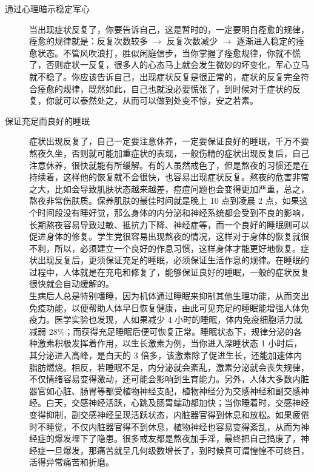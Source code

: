 \documentclass{ctexart}
\begin{document}
\begin{description}
    \item[通过心理暗示稳定军心] 当出现症状反复了，你要告诉自己，这是暂时的，一定要明白痊愈的规律，痊愈的规律就是：反复次数较多 $\to$ 反复次数减少 $\to$ 逐渐进入稳定的痊愈状态。不管风吹浪打，胜似闲庭信步，当你掌握了痊愈规律，你就不慌了，否则症状一反复，很多人的心态马上就会发生微妙的坏变化，军心立马就不稳了。你应该告诉自己，出现症状反复是很正常的，症状的反复完全符合痊愈的规律，既然如此，自己也就没必要慌张了，到时候对于症状的反复，你就可以泰然处之，从而可以做到处变不惊，安之若素。
    \item[保证充足而良好的睡眠] 症状出现反复了，自己一定要注意休养，一定要保证良好的睡眠，千万不要熬夜久坐，否则就可能加重症状的表现，一般伤精的症状出现反复后，自己注意休养，很快就能有所缓解。有的人虽然戒色了，但是熬夜的习惯还是在持续着，这样他的恢复就不会很快，也容易出现症状反复。熬夜的危害非常之大，比如会导致肌肤状态越来越差，痘痘问题也会变得更加严重，总之，熬夜非常伤肤质。保养肌肤的最佳时间就是晚上 10 点到凌晨 2 点，如果这个时间段没有睡好觉，那么身体的内分泌和神经系统都会受到不良的影响，长期熬夜容易导致过敏、抵抗力下降、神经症等，而一个良好的睡眠则可以促进身体的修复。学生党很容易出现熬夜的情况，这样对于身体的恢复就很不利，所以，必须建立一个良好的作息习惯，这样身体才能更好地恢复。症状出现反复后，更须保证充足的睡眠，必须保证生活作息的规律。在睡眠的过程中，人体就是在充电和修复了，能够保证良好的睡眠，一般的症状反复很快就会自动缓解的。\\ 生病后人总是特别嗜睡，因为机体通过睡眠来抑制其他生理功能，从而突出免疫功能，以便帮助人体早日恢复健康，由此可见充足的睡眠能增强人体免疫力。医学实验也发现，人如果减少 4 小时的睡眠，体内免疫细胞活力就减弱 28\%；而获得充足睡眠后便可恢复正常。睡眠状态下，规律分泌的各种激素积极发挥着作用，以生长激素为例，当你进入深睡状态 1 小时后，其分泌进入高峰，是白天的 3 倍多，该激素除了促进生长，还能加速体内脂肪燃烧。相反，若睡眠不足，内分泌就会紊乱，激素分泌就会丧失规律，不仅情绪容易变得激动，还可能会影响到生育能力。另外，人体大多数内脏器官如心脏、肠胃等都受植物神经支配，植物神经分为交感神经和副交感神经。白天，交感神经活跃，心跳及肠胃蠕动都加快；当你睡着时，交感神经变得抑制，副交感神经呈现活跃状态，内脏器官得到休息和放松。如果疲倦时不睡觉，不仅内脏器官得不到休息，植物神经也容易变得紊乱，从而为神经症的爆发埋下了隐患。很多戒友都是熬夜加手淫，最终把自己搞废了，神经症一旦爆发，那痛苦就呈几何级数增长了，到时候真可谓惶惶不可终日，活得异常痛苦和折磨。

\end{description}
\end{document}
